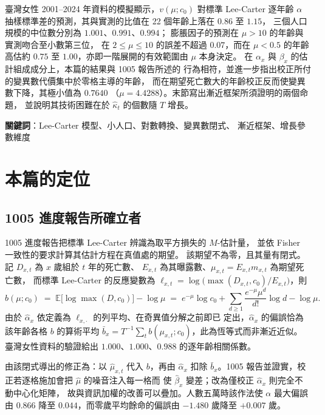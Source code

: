 \documentclass[UTF8, fontset=macnew, a4paper, 12pt]{ctexart}
\newcommand{\Ex}{\mathbb{E}}
\begin{document}
\begin{center}
\begin{minipage}{0.92\textwidth}
臺灣女性 2001--2024 年資料的模擬顯示，$v(\mu;c_0)$ 對標準 Lee-Carter 逐年齡
$\alpha$ 抽樣標準差的預測，其與實測的比值在 22 個年齡上落在 $0.86$ 至 $1.15$，
三個人口規模的中位數分別為 $1.001$、$0.991$、$0.994$；
膨脹因子的預測在 $\mu>10$ 的年齡與實測吻合至小數第三位，
在 $2\le\mu\le10$ 的誤差不超過 $0.07$，而在 $\mu<0.5$ 的年齡高估約 $0.75$ 至
$1.00$，亦即一階展開的有效範圍由 $\mu$ 本身決定。
在 $\alpha_x$ 與 $\beta_x$ 的估計組成成分上，本篇的結果與 1005 報告所述的
行為相符，並進一步指出校正所付的變異數代價集中於零格主導的年齡，
而在期望死亡數大的年齡校正反而使變異數下降，其極小值為 $0.7640$
（$\mu=4.4288$）。末節寫出漸近框架所須證明的兩個命題，
並說明其技術困難在於 $\hat\kappa_t$ 的個數隨 $T$ 增長。
\par\vspace{6pt}
\textbf{關鍵詞}：Lee-Carter 模型、小人口、對數轉換、變異數閉式、
漸近框架、增長參數維度
\end{minipage}
\end{center}

\vspace{10pt}

\section{本篇的定位}\label{sec:intro}

\subsection{1005 進度報告所確立者}

1005 進度報告把標準 Lee-Carter 辨識為取平方損失的 $M$-估計量，
並依 Fisher 一致性的要求計算其估計方程在真值處的期望。
該期望不為零，且其量有閉式。記 $D_{x,t}$ 為 $x$ 歲組於 $t$ 年的死亡數、
$E_{x,t}$ 為其曝露數、$\mu_{x,t}=E_{x,t}m_{x,t}$ 為期望死亡數，
而標準 Lee-Carter 的反應變數為
$\ell_{x,t}=\log\bigl(\max(D_{x,t},c_0)/E_{x,t}\bigr)$，則
\begin{equation}\label{eq:b}
b(\mu;c_0)\;=\;\Ex\bigl[\log\max(D,c_0)\bigr]-\log\mu
\;=\;e^{-\mu}\log c_0+\sum_{d\ge1}\frac{e^{-\mu}\mu^{d}}{d!}\log d-\log\mu .
\end{equation}
由於 $\hat\alpha_x$ 依定義為 $\ell_{x,\cdot}$ 的列平均、在奇異值分解之前即已
定出，$\hat\alpha_x$ 的偏誤恰為該年齡各格 $b$ 的算術平均
$\bar b_x=T^{-1}\sum_t b(\mu_{x,t};c_0)$，此為恆等式而非漸近近似。
臺灣女性資料的驗證給出 $1.000$、$1.000$、$0.988$ 的逐年齡相關係數。

由該閉式導出的修正為：以 $\hat\mu_{x,t}$ 代入 $b$，再由 $\hat\alpha_x$ 扣除
$\bar b_x$。1005 報告並證實，校正若逐格施加會把 $\hat\mu$ 的噪音注入每一格而
使 $\hat\beta_x$ 變差；改為僅校正 $\hat\alpha_x$ 則完全不動中心化矩陣，
故與資訊加權的改善可以疊加。人數五萬時該作法使 $\alpha$ 最大偏誤由
$0.866$ 降至 $0.044$，而零歲平均餘命的偏誤由 $-1.480$ 歲降至 $+0.007$ 歲。
\end{document}
